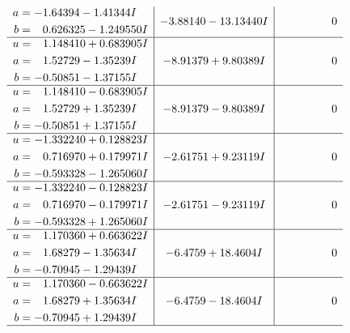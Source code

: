 \documentclass[1p]{elsarticle_modified}
\theoremstyle{definition}
\begin{document}
$$\begin{array}{c|c|c}
\begin{aligned}
a &= -1.64394 - 1.41344 I \\
b &= \phantom{-}0.626325 - 1.249550 I\end{aligned}
 & -3.88140 - 13.13440 I & \phantom{-0.000000 } 0 \\ \hline\begin{aligned}
u &= \phantom{-}1.148410 + 0.683905 I \\
a &= \phantom{-}1.52729 - 1.35239 I \\
b &= -0.50851 - 1.37155 I\end{aligned}
 & -8.91379 + 9.80389 I & \phantom{-0.000000 } 0 \\ \hline\begin{aligned}
u &= \phantom{-}1.148410 - 0.683905 I \\
a &= \phantom{-}1.52729 + 1.35239 I \\
b &= -0.50851 + 1.37155 I\end{aligned}
 & -8.91379 - 9.80389 I & \phantom{-0.000000 } 0 \\ \hline\begin{aligned}
u &= -1.332240 + 0.128823 I \\
a &= \phantom{-}0.716970 + 0.179971 I \\
b &= -0.593328 - 1.265060 I\end{aligned}
 & -2.61751 + 9.23119 I & \phantom{-0.000000 } 0 \\ \hline\begin{aligned}
u &= -1.332240 - 0.128823 I \\
a &= \phantom{-}0.716970 - 0.179971 I \\
b &= -0.593328 + 1.265060 I\end{aligned}
 & -2.61751 - 9.23119 I & \phantom{-0.000000 } 0 \\ \hline\begin{aligned}
u &= \phantom{-}1.170360 + 0.663622 I \\
a &= \phantom{-}1.68279 - 1.35634 I \\
b &= -0.70945 - 1.29439 I\end{aligned}
 & -6.4759 + 18.4604 I & \phantom{-0.000000 } 0 \\ \hline\begin{aligned}
u &= \phantom{-}1.170360 - 0.663622 I \\
a &= \phantom{-}1.68279 + 1.35634 I \\
b &= -0.70945 + 1.29439 I\end{aligned}
 & -6.4759 - 18.4604 I & \phantom{-0.000000 } 0\\
 \hline 

\end{array}$$
\end{document}
